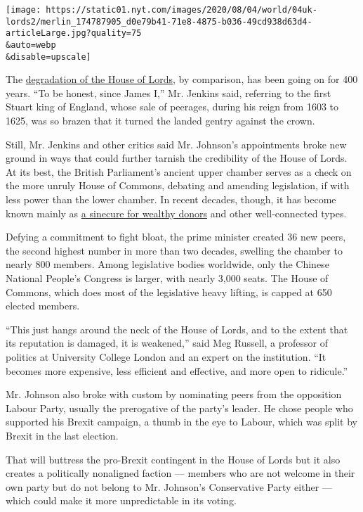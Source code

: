 \texttt{[image: https://static01.nyt.com/images/2020/08/04/world/04uk-lords2/merlin\_174787905\_d0e79b41-71e8-4875-b036-49cd938d63d4-articleLarge.jpg?quality=75\\\&auto=webp\\\&disable=upscale]}

The
\href{https://www.nytimes.com/2015/08/23/world/europe/a-british-house-overflowing-with-lords-draws-scorn.html}{degradation
of the House of Lords}, by comparison, has been going on for 400 years.
``To be honest, since James I,'' Mr. Jenkins said, referring to the
first Stuart king of England, whose sale of peerages, during his reign
from 1603 to 1625, was so brazen that it turned the landed gentry
against the crown.

Still, Mr. Jenkins and other critics said Mr. Johnson's appointments
broke new ground in ways that could further tarnish the credibility of
the House of Lords. At its best, the British Parliament's ancient upper
chamber serves as a check on the more unruly House of Commons, debating
and amending legislation, if with less power than the lower chamber. In
recent decades, though, it has become known mainly as
\href{https://www.nytimes.com/2009/01/29/world/europe/29iht-lords.1.19775638.html}{a
sinecure for wealthy donors} and other well-connected types.

Defying a commitment to fight bloat, the prime minister created 36 new
peers, the second highest number in more than two decades, swelling the
chamber to nearly 800 members. Among legislative bodies worldwide, only
the Chinese National People's Congress is larger, with nearly 3,000
seats. The House of Commons, which does most of the legislative heavy
lifting, is capped at 650 elected members.

``This just hangs around the neck of the House of Lords, and to the
extent that its reputation is damaged, it is weakened,'' said Meg
Russell, a professor of politics at University College London and an
expert on the institution. ``It becomes more expensive, less efficient
and effective, and more open to ridicule.''

Mr. Johnson also broke with custom by nominating peers from the
opposition Labour Party, usually the prerogative of the party's leader.
He chose people who supported his Brexit campaign, a thumb in the eye to
Labour, which was split by Brexit in the last election.

That will buttress the pro-Brexit contingent in the House of Lords but
it also creates a politically nonaligned faction --- members who are not
welcome in their own party but do not belong to Mr. Johnson's
Conservative Party either --- which could make it more unpredictable in
its voting.

